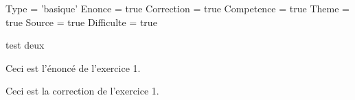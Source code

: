 \documentclass{classe-tex3R}
\begin{document}
  \begin{luacode}
    Type = 'basique'
    Enonce = true
    Correction = true
    Competence = true
    Theme = true
    Source = true
    Difficulte = true
  \end{luacode}
  \parametrage


test deux


\begin{enonce}
  Ceci est l'énoncé de l'exercice 1.
\end{enonce}

\begin{correction}
  Ceci est la correction de l'exercice 1.
\end{correction}
\end{document}

